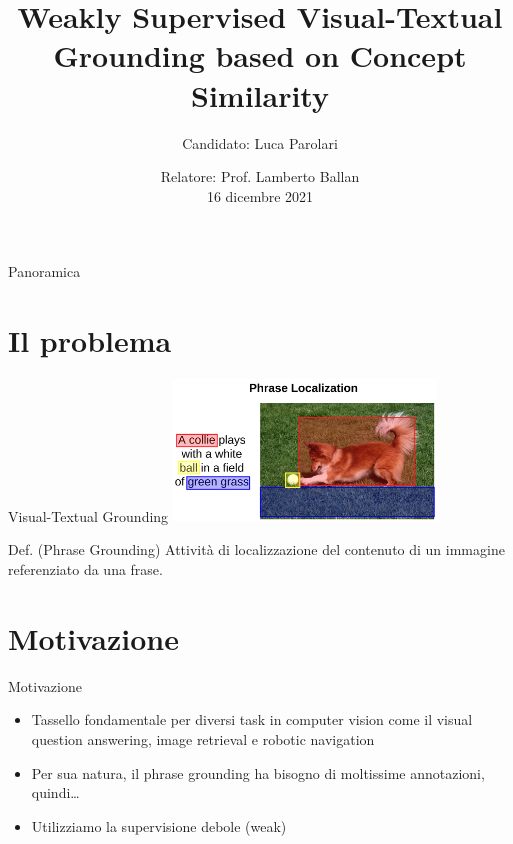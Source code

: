 \documentclass{beamer}
\title{Weakly Supervised Visual-Textual Grounding based on Concept Similarity}
\author{Candidato: Luca Parolari}
\date{Relatore: Prof. Lamberto Ballan \\ \vspace{0.2cm} \small 16 dicembre 2021}
\begin{document}
\maketitle

\begin{frame}{Panoramica}
  \tableofcontents
\end{frame}

\section{Il problema}

\begin{frame}{Visual-Textual Grounding}
  \centering
  \includegraphics[width=7cm]{images/dog-playing-with-ball.png}

  \vspace{0.5cm}

  \begin{alertblock}{Def. (Phrase Grounding)}
    Attività di localizzazione del contenuto di un immagine referenziato da una
    frase.
  \end{alertblock}
\end{frame}

\section{Motivazione}

\begin{frame}{Motivazione}
  \begin{itemize}
    \item Tassello fondamentale per diversi task in computer vision
    come il \alert{visual question answering}, \alert{image retrieval}
    e \alert{robotic navigation}
    \vspace{0.5cm}
    \item Per sua natura, il phrase grounding ha bisogno di
    \alert{moltissime annotazioni}, quindi\dots
    \item Utilizziamo la supervisione debole (weak)
  \end{itemize}
\end{frame}
\end{document}
